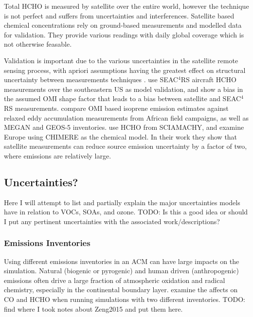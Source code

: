     Total HCHO is measured by satellite over the entire world, however the technique is not perfect and suffers from uncertainties and interferences.
    Satellite based chemical concentrations rely on ground-based measurements and modelled data for validation.
    They provide various readings with daily global coverage which is not otherwise feasable.
    
    Validation is important due to the various uncertainties in the satellite remote sensing process, with apriori assumptions having the greatest effect on structural uncertainty between measurements techniques \cite{Lorente2017}.
    \cite{Zhu2016} use SEAC$^4$RS aircraft HCHO measurements over the southeastern US as model validation, and show a bias in the assumed OMI shape factor that leads to a bias between satellite and SEAC$^4$RS measurements.
    \cite{Marais2014} compare OMI based isoprene emission estimates against relaxed eddy accumulation measurements from African field campaigns, as well as MEGAN and GEOS-5 inventories.
    \cite{Dufour2009} use HCHO from SCIAMACHY, and examine Europe using CHIMERE as the chemical model. 
    In their work they show that satellite measurements can reduce source emission uncertainty by a factor of two, where emissions are relatively large.
  
  
  \subsection{Uncertainties?}
  \label{LR:Models:Uncert}
    
    Here I will attempt to list and partially explain the major uncertainties models have in relation to  VOCs, SOAs, and ozone. 
    TODO: Is this a good idea or should I put any pertinent uncertainties with the associated work/descriptions?
    
    
    \subsubsection{Emissions Inventories}
      Using different emissions inventories in an ACM can have large impacts on the simulation.
      Natural (biogenic or pyrogenic) and human driven (anthropogenic) emissions often drive a large fraction of atmospheric oxidation and radical chemistry, especially in the continental boundary layer.
      \cite{Zeng2015} examine the affects on CO and HCHO when running simulations with two different inventories.
      TODO: find where I took notes about Zeng2015 and put them here.
      
